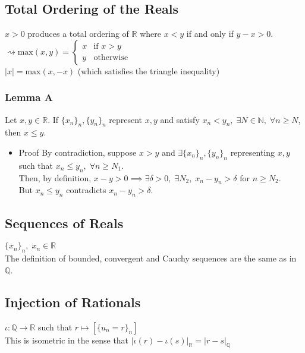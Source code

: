 \documentclass[11pt]{article}
\newcommand{\0}{\emptyset}
\newcommand{\N}{\mathbb{N}}
\newcommand{\Q}{\mathbb{Q}}
\newcommand{\R}{\mathbb{R}}
\begin{document}
\subsection*{Total Ordering of the Reals}
\label{sec:org3b377a2}
\(x>0\) produces a total ordering of \(\R\) where \(x<y\) if and only if \(y-x>0\).\\[0pt]
\(\rightsquigarrow\text{max}(x,y)=\begin{cases}x & \text{if }x>y \\ y & \text{otherwise}\end{cases}\)\\[0pt]
\(|x|=\text{max}(x,-x)\) (which satisfies the triangle inequality)\\[0pt]
\subsubsection*{Lemma A}
\label{sec:org1e020d0}
Let \(x,y\in\R\). If \(\{x_{n}\}_{n},\{y_{n}\}_{n}\) represent \(x,y\) and satisfy \(x_{n}<y_{n},\;\exists N\in\N,\;\forall n\geq N\), then \(x\leq y\).\\[0pt]
\begin{itemize}
\item Proof
\label{sec:org5a2c7f8}
By contradiction, suppose \(x>y\) and \(\exists \{x_{n}\}_{n},\{y_{n}\}_{n}\) representing \(x,y\) such that \(x_{n}\leq y_{n},\;\forall n\geq N_{1}\).\\[0pt]
Then, by definition, \(x-y>0\implies\exists\delta>0,\;\exists N_{2},\;x_{n}-y_{n}>\delta\) for \(n\geq N_{2}\).\\[0pt]
But \(x_{n}\leq y_{n}\) contradicts \(x_{n}-y_{n}>\delta\).\\[0pt]
\end{itemize}
\subsection*{Sequences of Reals}
\label{sec:org1244928}
\(\{x_{n}\}_{n},\;x_{n}\in\R\)\\[0pt]
The definition of bounded, convergent and Cauchy sequences are the same as in \(\Q\).\\[0pt]
\subsection*{Injection of Rationals}
\label{sec:org1f25b32}
\(\iota:\Q\to\R\) such that \(r\mapsto[\{u_{n}=r\}_{n}]\)\\[0pt]
This is isometric in the sense that \(|\iota(r)-\iota(s)|_{\R}=|r-s|_{\Q}\)\\[0pt]
\end{document}
